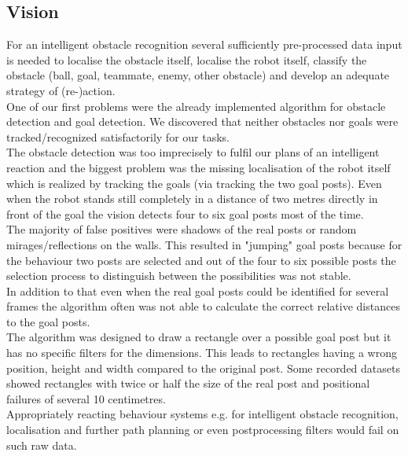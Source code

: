\documentclass[lnicst,a4paper]{svmultln}
\begin{document}
\subsection{Vision}
\label{sec:problems_vision}
For an intelligent obstacle recognition several sufficiently pre-processed data input is needed to localise the obstacle itself, localise the robot itself, classify the obstacle (ball, goal, teammate, enemy, other obstacle) and develop an adequate strategy of (re-)action.
\\
One of our first problems were the already implemented algorithm for obstacle detection and goal detection. We discovered that neither obstacles nor goals were tracked/recognized satisfactorily for our tasks.
\\
The obstacle detection was too imprecisely to fulfil our plans of an intelligent reaction and the biggest problem was the missing localisation of the robot itself which is realized by tracking the goals (via tracking the two goal posts). Even when the robot stands still completely in a distance of two metres directly in front of the goal the vision detects four to six goal posts most of the time.
\\
The majority of false positives were shadows of the real posts or random mirages/reflections on the walls. This resulted in "jumping" goal posts because for the behaviour two posts are selected and out of the four to six possible posts the selection process to distinguish between the possibilities was not stable.
\\
In addition to that even when the real goal posts could be identified for several frames the algorithm often was not able to calculate the correct relative distances to the goal posts.
\\
The algorithm was designed to draw a rectangle over a possible goal post but it has no specific filters for the dimensions. This leads to rectangles having a wrong position, height and width compared to the original post. Some recorded datasets showed rectangles with twice or half the size of the real post and positional failures of several 10 centimetres.
\\
Appropriately reacting behaviour systems e.g. for intelligent obstacle recognition, localisation and further path planning or even postprocessing filters would fail on such raw data.
\end{document}
